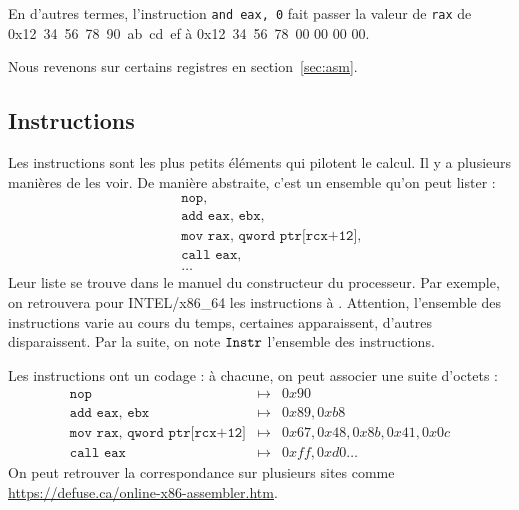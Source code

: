 \documentclass{book}
\newcommand{\code}[1]{\texttt{#1}}
\begin{document}
{

En d'autres termes, l'instruction \code{and eax, 0} fait passer la valeur de \code{rax} de 0x12\ 34\ 56\ 78\ 90\ ab\ cd\ ef à 0x12\ 34\ 56\ 78\ 00 00 00 00. 

Nous revenons sur certains registres en section~\ref{sec:asm}. 
 
\subsection{Instructions}

\newcommand{\Instr}{{\tt Instr}}

Les instructions sont les plus petits éléments qui pilotent le calcul. Il y a plusieurs manières de les voir. De manière abstraite, c'est un ensemble qu'on peut lister : 
\begin{eqnarray*}
&&\code{nop},\\
&&\code{add eax, ebx},\\
&&\code{mov rax, qword ptr[rcx+12]},\\
&&\code{call eax},\\
&&\ldots
\end{eqnarray*} 
Leur liste se trouve dans le manuel du constructeur du processeur. Par exemple, on retrouvera pour INTEL/x86\_64 les instructions à \cite{IntelSetInstruction}. Attention, l'ensemble des instructions varie au cours du temps, certaines apparaissent, d'autres disparaissent. Par la suite, on note $\Instr$ l'ensemble des instructions. 

Les instructions ont un codage : à chacune, on peut associer une suite d'octets : 
\begin{eqnarray*}
	\code{nop} &\mapsto& 0x90\\
	\code{add eax, ebx} &\mapsto& 0x89, 0xb8\\
	\code{mov rax, qword ptr[rcx+12]} &\mapsto&  0x67, 0x48, 0x8b, 0x41, 0x0c\\
	\code{call eax} &\mapsto& 0xff, 0xd0
	\ldots
\end{eqnarray*} 
On peut retrouver la correspondance sur plusieurs sites comme \url{https://defuse.ca/online-x86-assembler.htm}. 
 
}
\end{document}
